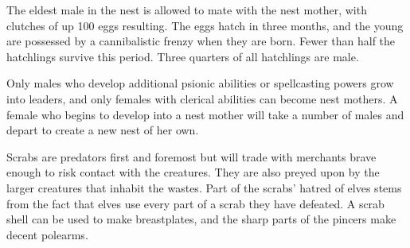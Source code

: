 The eldest male in the nest is allowed to mate with the nest mother, with clutches of up 100 eggs resulting. The eggs hatch in three months, and the young are possessed by a cannibalistic frenzy when they are born. Fewer than half the hatchlings survive this period. Three quarters of all hatchlings are male.

Only males who develop additional psionic abilities or spellcasting powers grow into leaders, and only females with clerical abilities can become nest mothers. A female who begins to develop into a nest mother will take a number of males and depart to create a new nest of her own.

Scrabs are predators first and foremost but will trade with merchants brave enough to risk contact with the creatures. They are also preyed upon by the larger creatures that inhabit the wastes. Part of the scrabs' hatred of elves stems from the fact that elves use every part of a scrab they have defeated. A scrab shell can be used to make breastplates, and the sharp parts of the pincers make decent polearms.

